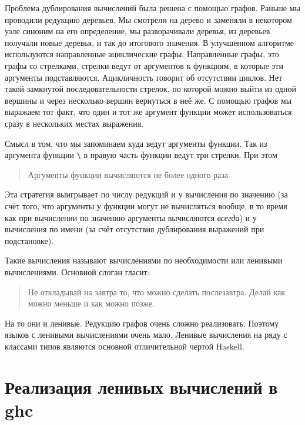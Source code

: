 Проблема дублирования вычислений была решена с помощью графов.
Раньше мы проводили редукцию деревьев. Мы смотрели на дерево и
заменяли в некотором узле синоним на его определение, мы
разворачивали деревья, из деревьев получали новые деревья,
и так до итогового значения. В улучшенном алгоритме используются
направленные ациклические графы. Направленные графы, это
графы со стрелками, стрелки ведут от аргументов к функциям,
в которые эти аргументы подставляются. Ацикличность говорит об 
отсутствии циклов. Нет такой замкнутой последовательности стрелок,
по которой можно выйти из одной вершины и через несколько
вершин вернуться в неё же. С помощью графов мы выражаем
тот факт, что один и тот же аргумент функции может использоваться
сразу в нескольких местах выражения. 

Смысл в том, что мы запоминаем куда ведут аргументы
функции. Так из аргумента функции 
\verb!\! в правую часть
функции ведут три стрелки. При этом

\begin{quote}

Аргументы функции вычисляются не более одного раза.

\end{quote}

Эта стратегия выигрывает по числу редукций и у вычисления
по значению (за счёт того, что аргументы у функции могут
не вычисляться вообще, в то время как при вычислении по
значению аргументы вычисляются \emph{всегда}) и у вычисления 
по имени (за счёт отсутствия дублирования выражений при подстановке).

Такие вычисления называют вычислениями по необходимости
или ленивыми вычислениями. Основной слоган гласит:

\begin{quote}

Не откладывай на завтра то, что можно сделать послезавтра.
Делай как можно меньше и как можно позже.

\end{quote}

На то они и ленивые. Редукцию графов очень сложно реализовать.
Поэтому языков с ленивыми вычислениями очень мало. Ленивые вычисления
на ряду с классами типов являются основной отличительной чертой Haskell. 

\section{Реализация ленивых вычислений в ghc}

